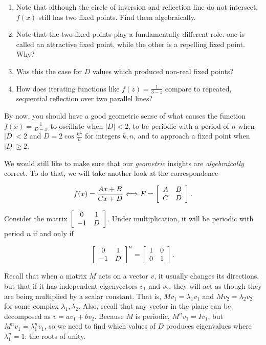 \documentclass[../gatm.tex]{subfiles}
\begin{document}
\begin{enumerate}
\begin{enumerate}
\item Note that although the circle of inversion and reflection line do not intersect, $f(x)$ still has two fixed points. Find them algebraically.
\item Note that the two fixed points play a fundamentally different role. one is called an attractive fixed point, while the other is a repelling fixed point. Why?
\item Was this the case for $D$ values which produced non-real fixed points?
\item How does iterating functions like $f(z)=\frac{1}{3-z}$ compare to repeated, sequential reflection over two parallel lines?
\end{enumerate}
\end{enumerate}
By now, you should have a good geometric sense of what causes the function $f(x)=\frac{1}{D-x}$ to oscillate when $|D|<2$, to be periodic with a period of $n$ when $|D|<2$ and $D=2\cos \frac{k\pi}{n}$ for integers $k,n$, and to approach a fixed point when $|D|\geq 2$.

We would still like to make sure that our \textit{geometric} insights are \textit{algebraically} correct. To do that, we will take another look at the correspondence


$$f(x)=\frac{Ax+B}{Cx+D}\Longleftrightarrow F=\left[\begin{array}{cc} A & B \\ C & D \end{array}\right].$$

Consider the matrix $\left[\begin{array}{cc} 0 & 1 \\ -1 & D \end{array}\right]$. Under multiplication, it will be periodic with period $n$ if and only if

$$\left[\begin{array}{cc} 0 & 1 \\ -1 & D \end{array}\right]^n=\left[\begin{array}{cc} 1 & 0 \\ 0 & 1 \end{array}\right].$$

Recall that when a matrix $M$ acts on a vector $v$, it usually changes its directions, but that if it has independent eigenvectors $v_1$ and $v_2$, they will act as though they are being multiplied by a scalar constant. That is, $Mv_1=\lambda_1 v_1$ and $Mv_2=\lambda_2 v_2$ for some complex $\lambda_1,\lambda_2$. Also, recall that any vector in the plane can be decomposed as $v=av_1+bv_2$. Because $M$ is periodic, $M^nv_1=Iv_1$, but $M^nv_1=\lambda_1^n v_1$, so we need to find which values of $D$ produces eigenvalues where $\lambda_1^n=1$: the roots of unity.
\end{document}
